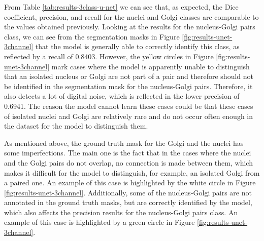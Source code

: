 \begin{table}[!htb]
\centering
\caption{Average metric values after testing the 3 class \ac{3D} U-Net model on two pre-processed microscopic images}
\label{tab:results-3class-u-net}
\end{table}

From Table \ref{tab:results-3class-u-net} we can see that, as expected, the Dice coefficient, precision, and recall for the nuclei and Golgi classes are comparable to the values obtained previously. Looking at the results for the nucleus-Golgi pairs class, we can see from the segmentation masks in Figure \ref{fig:results-unet-3channel} that the model is generally able to correctly identify this class, as reflected by a recall of 0.8403. However, the yellow circles in Figure \ref{fig:results-unet-3channel} mark cases where the model is apparently unable to distinguish that an isolated nucleus or Golgi are not part of a pair and therefore should not be identified in the segmentation mask for the nucleus-Golgi pairs. Therefore, it also detects a lot of digital noise, which is reflected in the lower precision of 0.6941. The reason the model cannot learn these cases could be that these cases of isolated nuclei and Golgi are relatively rare and do not occur often enough in the dataset for the model to distinguish them.

As mentioned above, the ground truth mask for the Golgi and the nuclei has some imperfections. The main one is the fact that in the cases where the nuclei and the Golgi pairs do not overlap, no connection is made between them, which makes it difficult for the model to distinguish, for example, an isolated Golgi from a paired one. An example of this case is highlighted by the white circle in Figure \ref{fig:results-unet-3channel}. Additionally, some of the nucleus-Golgi pairs are not annotated in the ground truth masks, but are correctly identified by the model, which also affects the precision results for the nucleus-Golgi pairs class. An example of this case is highlighted by a green circle in Figure \ref{fig:results-unet-3channel}.

